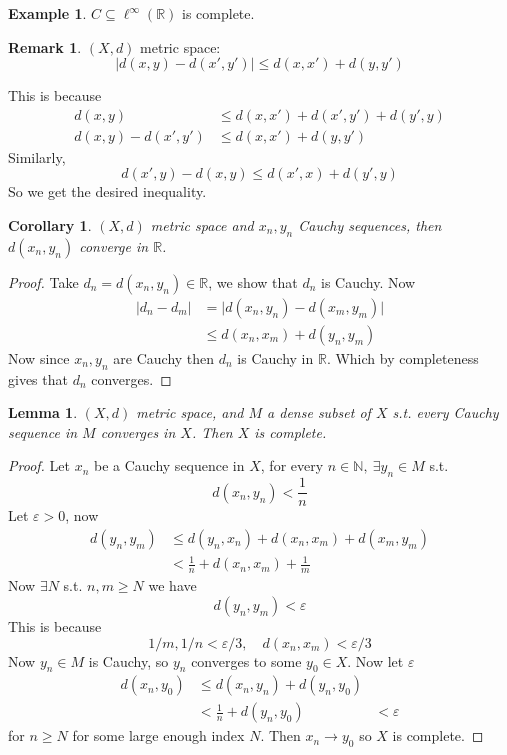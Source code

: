 \documentclass[11pt,a4paper]{article}
\theoremstyle{definition}
\newtheorem{example}[definition]{Example}
\newtheorem{remark}[definition]{Remark}
\theoremstyle{plain}
\newtheorem{lemma}[definition]{Lemma}
\newtheorem{corollary}[definition]{Corollary}
\theoremstyle{remark}
\newcommand{\R}{\mathbb{R}}
\newcommand{\N}{\mathbb{N}}
\newcommand{\abs}[1]{\lvert #1 \rvert}
\newcommand{\1}{\mathbbm{1}}
\begin{document}
\begin{example}
    $C \subseteq \ell^\infty(\R)$ is complete. 
\end{example}

\begin{remark}
    $(X,d)$ metric space: 
    $$\abs{d(x,y) - d(x',y')} \le d(x,x') + d(y,y')$$

    This is because 
    \begin{align*}
        d(x,y) &\le d(x,x') + d(x', y') + d(y',y) \\
        d(x,y) - d(x',y') &\le d(x,x') + d(y,y') 
    \end{align*}
    Similarly, 
    $$d(x',y) - d(x,y) \le d(x',x) + d(y',y)$$
    So we get the desired inequality.
\end{remark}

\begin{corollary}
    $(X,d)$ metric space and $x_n, y_n$ Cauchy sequences, then $d(x_n, y_n)$ converge in $\R$.
\end{corollary}

\begin{proof}
    Take $d_n = d(x_n, y_n) \in \R$, we show that $d_n$ is Cauchy. Now 
    \begin{align*}
        \abs{d_n - d_m} &= \abs{d(x_n, y_n) - d(x_m, y_m)} \\
        &\le d(x_n, x_m) + d(y_n, y_m) 
    \end{align*}
    Now since $x_n, y_n$ are Cauchy then $d_n$ is Cauchy in $\R$. Which by completeness gives that $d_n$ converges.
\end{proof}

\begin{lemma}
    $(X,d)$ metric space, and $M$ a dense subset of $X$ s.t. every Cauchy sequence in $M$ converges in $X$. Then $X$ is complete.
\end{lemma}

\begin{proof}
    Let $x_n$ be a Cauchy sequence in $X$, for every $n \in \N, \ \exists y_n \in M$ s.t. 
    $$d(x_n, y_n) < \frac{1}{n}$$
    Let $\varepsilon > 0$, now 
    \begin{align*}
        d(y_n, y_m) &\le d(y_n, x_n) + d(x_n, x_m) + d(x_m, y_m) \\
        &< \frac{1}{n} + d(x_n, x_m) + \frac{1}{m}
    \end{align*}
    Now $\exists N$ s.t. $n,m \ge N$ we have 
    $$d(y_n, y_m) < \varepsilon$$
    This is because
    $$1/m, 1/n < \varepsilon/3, \quad d(x_n, x_m) < \varepsilon/3$$
    Now $y_n \in M$ is Cauchy, so $y_n$ converges to some $y_0 \in X$. Now let $\varepsilon$
    \begin{align*}
        d(x_n, y_0) &\le d(x_n, y_n) + d(y_n, y_0) \\
        &< \frac{1}{n} + d(y_n, y_0)
        &< \varepsilon
    \end{align*}
    for $n \ge N$ for some large enough index $N$. Then $x_n \to y_0$ so $X$ is complete.
\end{proof}
\end{document}
